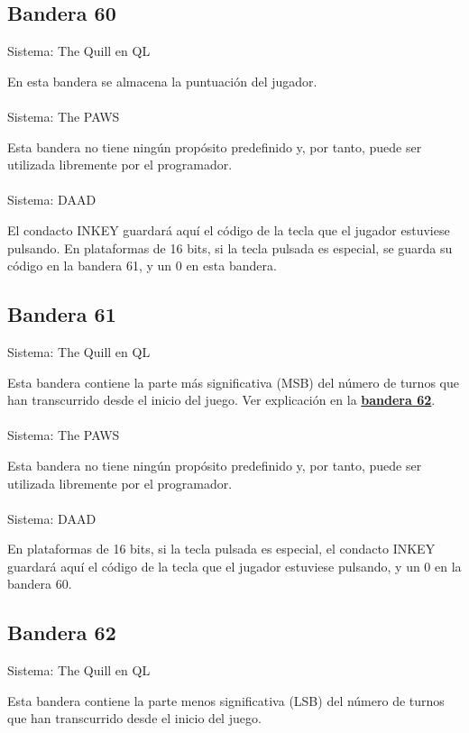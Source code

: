\documentclass[11pt, a5paper]{article}
\newcommand{\quill}{\textsf{The Quill}\xspace}
\newcommand{\paw}{\textsf{The PAWS}\xspace}
\newcommand{\daad}{\textsf{DAAD}\xspace}
\newcommand{\sistema}[1]{\noindent Sistema: #1 \nopagebreak}
\begin{document}
\subsection{Bandera 60}\label{flag60}

\sistema{\quill en QL}

En esta bandera se almacena la puntuación del jugador.
\\\ \\
\sistema{\paw}

Esta bandera no tiene ningún propósito predefinido y, por tanto, puede ser utilizada libremente por el programador.
\\\ \\
\sistema{\daad}

El condacto INKEY guardará aquí el código de la tecla que el jugador estuviese pulsando. En plataformas de 16 bits, si la tecla pulsada es especial, se guarda su código en la bandera 61, y un 0 en esta bandera. \cite[págs. 25, 61 y 62]{DAAD}

\subsection{Bandera 61}\label{flag61}

\sistema{\quill en QL}

Esta bandera contiene la parte más significativa (MSB) del número de turnos que han transcurrido desde el inicio del juego. Ver explicación en la \hyperref[flag62]{\textbf{bandera 62}}.
\\\ \\
\sistema{\paw}

Esta bandera no tiene ningún propósito predefinido y, por tanto, puede ser utilizada libremente por el programador.
\\\ \\
\sistema{\daad}

En plataformas de 16 bits, si la tecla pulsada es especial, el condacto INKEY guardará aquí el código de la tecla que el jugador estuviese pulsando, y un 0 en la bandera 60. \cite[págs. 25, 61 y 62]{DAAD}

\subsection{Bandera 62}\label{flag62}

\sistema{\quill en QL}

Esta bandera contiene la parte menos significativa (LSB) del número de turnos que han transcurrido desde el inicio del juego.
\end{document}
